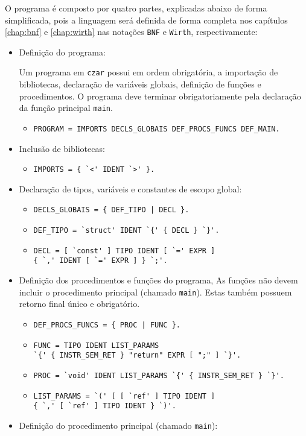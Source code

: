 
O programa é composto por quatro partes, explicadas abaixo de forma 
simplificada, pois a linguagem será definida de forma completa nos 
capítulos \ref{chap:bnf} e \ref{chap:wirth} nas notações \verb!BNF! e
\verb!Wirth!, respectivamente:

\begin{itemize}
    \item Definição do programa:
            
            Um programa em \verb!czar! possui em ordem obrigatória, a
            importação de bibliotecas, declaração de variáveis globais,
            definição de funções e procedimentos. O programa deve terminar
            obrigatoriamente pela declaração da função principal \verb!main!.

        \begin{itemize}
            \item \verb$PROGRAM = IMPORTS DECLS_GLOBAIS DEF_PROCS_FUNCS DEF_MAIN.$
        \end{itemize}
    \item Inclusão de bibliotecas:
        \begin{itemize}
            \item \verb$IMPORTS = { `<' IDENT `>' }.$
        \end{itemize}
    \item Declaração de tipos, variáveis e constantes de escopo global:
        \begin{itemize}
            \item \verb$DECLS_GLOBAIS = { DEF_TIPO | DECL }.$
            \item \verb$DEF_TIPO = `struct' IDENT `{' { DECL } `}'.$
            \item \verb$DECL = [ `const' ] TIPO IDENT [ `=' EXPR ]$\\
                    \verb${ `,' IDENT [ `=' EXPR ] } `;'.$
        \end{itemize}
    \item Definição dos procedimentos e funções do programa, 
        As funções não devem incluir o procedimento principal (chamado
        \verb!main!). Estas também possuem retorno final único e obrigatório. 
        \begin{itemize}
            \item \verb$DEF_PROCS_FUNCS = { PROC | FUNC }.$
            \item \verb$FUNC = TIPO IDENT LIST_PARAMS$\\
                    \verb$`{' { INSTR_SEM_RET } "return" EXPR [ ";" ] `}'.$
            \item \verb$PROC = `void' IDENT LIST_PARAMS `{' { INSTR_SEM_RET } `}'.$
            \item \verb$LIST_PARAMS = `(' [ [ `ref' ] TIPO IDENT ]$\\
                    \verb${ `,' [ `ref' ] TIPO IDENT } `)'.$
        \end{itemize}
    \item Definição do procedimento principal (chamado \verb!main!):
            

\end{itemize}
